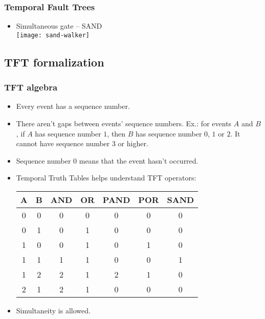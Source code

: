 \begin{frame}
\frametitle{Temporal Fault Trees}
\begin{itemize}
  \item Simultaneous gate -- SAND\\
  \texttt{[image: sand-walker]}
\end{itemize}
\end{frame}

\subsection{TFT formalization}

\begin{frame}
\frametitle{TFT algebra}

\begin{itemize}
  \item Every event has a sequence number.
  \item There aren't gaps between events' sequence numbers. Ex.: for events $A$ and $B$, if $A$ has sequence number $1$, then $B$ has sequence number $0$, $1$ or $2$. It cannot have sequence number $3$ or higher.
  \item Sequence number $0$ means that the event hasn't occurred.
  \item Temporal Truth Tables helps understand TFT operators:
  {
  \scriptsize
  \begin{tabular}{c|c|c|c|c|c|c}
  A & B & AND & OR & PAND & POR & SAND\\
  \hline
  0 & 0 & 0 & 0 & 0 & 0 & 0\\
  \hline
  0 & 1 & 0 & 1 & 0 & 0 & 0\\
  \hline
  1 & 0 & 0 & 1 & 0 & 1 & 0\\
  \hline
  1 & 1 & 1 & 1 & 0 & 0 & 1\\
  \hline
  1 & 2 & 2 & 1 & 2 & 1 & 0\\
  \hline
  2 & 1 & 2 & 1 & 0 & 0 & 0\\
  \hline
  \end{tabular}
  }
  \item Simultaneity is allowed.
\end{itemize}

\end{frame}

